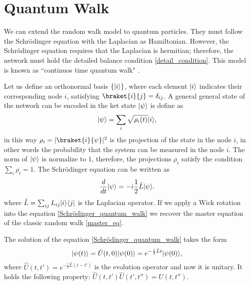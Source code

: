 \section{Quantum Walk}
We can extend the random walk model to quantum particles. 
They must follow the Schrödinger equation with the Laplacian as Hamiltonian. However, the Schrödinger equation requires that the Laplacian is hermitian; therefore, the network must hold the detailed balance condition \eqref{detail_condition}.
This model is known as “continuos time quantum walk" \cite{Farhi_98}.

Let us define an orthonormal basis $\{\lvert i\rangle\}$, where each element $\lvert i\rangle$ indicates their corresponding node $i$, satisfying $\braket{i}{j}=\delta_{ij}$. 
A general general state of the network can be encoded in the ket state $\lvert\psi\rangle$ is define as
\begin{equation}\label{ket_state_quantum}
    \lvert\psi\rangle = \sum_i \sqrt{\rho_i(t)} \lvert i\rangle,
\end{equation}
in this way $\rho_i = |\braket{i}{\psi}|^2$ is the projection of the state in the node $i$, in other words the probability that the system can be measured in the node $i$. The norm of $\lvert\psi\rangle$ is normalize to $1$, therefore, the projections $\rho_i$ satisfy the condition $\sum_i \rho_i = 1$.
The Schrödinger equation can be written as
\begin{equation}\label{Schrödinger_quantum_walk}
    \frac{d}{dt}\lvert\psi\rangle = -i\frac{1}{2}\hat L\lvert\psi\rangle.
\end{equation}
where $\hat L = \sum_{ij} L_{ij}\lvert i\rangle\langle j\rvert$ is the Laplacian operator.
If we apply a Wick rotation into the equation \eqref{Schrödinger_quantum_walk} we recover the master equation of the classic random walk \eqref{master_eq}.

The solution of the equation \eqref{Schrödinger_quantum_walk} takes the form
\begin{equation}
    \lvert\psi(t)\rangle = \hat U(t,0) \lvert\psi(0)\rangle = e^{-\frac{i}{2}\hat L t} \lvert\psi(0)\rangle,
\end{equation}
where $\hat U(t,t') =e^{-\frac{i}{2}\hat L (t-t')}$ is the evolution operator and now it is unitary. It holds the following property: $\hat U(t,t')\hat U(t',t'') = U(t,t'')$.

